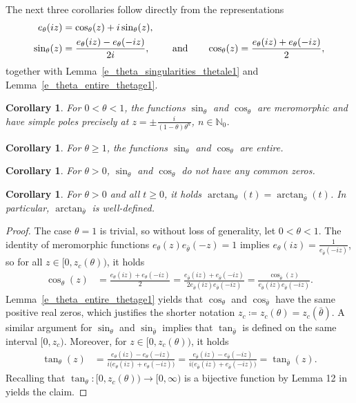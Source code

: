 \documentclass[10pt,a4paper]{amsart}
\newcommand{\N}{\mathbb{N}} %
\newcommand{\1}{\mathds{1}}
\newtheorem{Corollary}[definition]{Corollary}
\begin{document}
The next three corollaries follow directly from the representations
\begin{align}
     e_\theta(iz)&=\cos_\theta(z)+i\sin_\theta(z),\notag
        \\ \sin_\theta(z)&=\frac{e_\theta(iz)-e_\theta(-iz)}{2i},\qquad\text{ and}\qquad \cos_\theta(z)=\frac{e_\theta(iz)+e_\theta(-iz)}{2},\label{sin_sum_e}
     \end{align}
     together with Lemma~\ref{e_theta_singularities_thetale1} and Lemma~\ref{e_theta_entire_thetage1}.
\begin{Corollary}\label{sin_and_cos_prelim_1}
    For $0<\theta<1$, the functions $\sin_\theta$ and $\cos_\theta$ are meromorphic and have simple poles precisely at $z=\pm\frac{i}{(1-\theta)\theta^n}$, $n\in\N_0$.  
 \end{Corollary}
\begin{Corollary}\label{sin_and_cos_prelim_2}
    For $\theta\ge1$, the functions $\sin_\theta$ and $\cos_\theta$ are entire. 
\end{Corollary}
\begin{Corollary}\label{sin_and_cos_prelim_3}
   For $\theta>0$, $\sin_\theta$ and $\cos_\theta$ do not have any common zeros.
\end{Corollary}
\begin{Corollary}\label{arctan_cor}
   For $\theta >0$ and all $t\ge 0$, it holds $\arctan_{\theta}(t)=\arctan_{\bar\theta }(t)$. In particular, $\arctan_{\bar\theta }$ is well-defined.
\end{Corollary}
\begin{proof}
 The case $\theta=1$ is trivial, so without loss of generality, let $0<\theta<1$. The identity of meromorphic functions $ e_{\theta }(z)e_{\bar\theta }(-z)=1 $ implies $e_{\theta } (iz) = \frac{1}{e_{\bar\theta }(-iz)} $, so for all $z\in[0,z_c(\theta))$, it holds
    \begin{align*}
       \cos_\theta(z)&=\frac{e_\theta(iz)+e_\theta(-iz)}{2}
       =\frac{e_{\bar\theta}(iz)+e_{\bar\theta}(-iz)}{2e_{\bar\theta}(iz)e_{\bar\theta}(-iz)}=\frac{\cos_{\bar\theta}(z)}{e_{\bar\theta}(iz)e_{\bar\theta}(-iz)}.
    \end{align*}
    Lemma~\ref{e_theta_entire_thetage1} yields that $\cos_\theta$ and $\cos_{\bar\theta}$ have the same positive real zeros, which justifies the shorter notation $z_c\coloneqq z_c(\theta)=z_c(\bar\theta)$. A similar argument for $\sin_\theta$ and $\sin_{\bar\theta}$ implies that $\tan_{\bar\theta }$ is defined on the same interval $[0,z_c)$. Moreover, for $z\in[0,z_c(\theta))$, it holds
\begin{align*} 
    \tan_{\theta}(z)
    &= \frac{ e_{\theta } (iz)-e_{\theta }(-iz) }{ i\bigl(e_{\theta } (iz)+e_{\theta }(-iz)\bigr) } 
    = \frac{ e_{\bar\theta } (iz)-e_{\bar\theta }(-iz) }{ i\bigl( e_{\bar\theta } (iz)+e_{\bar\theta }(-iz) \bigr) } 
    = \tan_{\bar\theta }(z).
\end{align*} 
Recalling that $\tan_{\theta}:[0,z_c(\theta))\to[0,\infty)$ is a bijective function by Lemma 12 in \cite{AR} yields the claim.
\end{proof}
\end{document}
